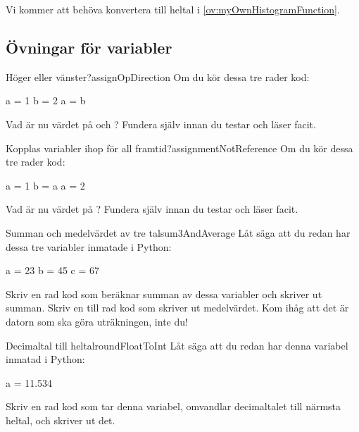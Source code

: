 Vi kommer att behöva konvertera till heltal i \autoref{ov:myOwnHistogramFunction}.

\subsection{Övningar för variabler}

\begin{matteovning}{Höger eller vänster?}{assignOpDirection}
Om du kör dessa tre rader kod:
\vspace{10pt}
\begin{python}
a = 1
b = 2
a = b
\end{python}

Vad är nu värdet på  och ? Fundera själv innan du testar och läser facit.
\end{matteovning}

\begin{matteovning}{Kopplas variabler ihop för all framtid?}{assignmentNotReference}
Om du kör dessa tre rader kod:
\vspace{10pt}
\begin{python}
a = 1
b = a
a = 2
\end{python}

Vad är nu värdet på ? Fundera själv innan du testar och läser facit.
\end{matteovning}

\begin{matteovning}{Summan och medelvärdet av tre tal}{sum3AndAverage}
Låt säga att du redan har dessa tre variabler inmatade i Python:
\vspace{10pt}
\begin{python}
a = 23
b = 45
c = 67
\end{python}

Skriv en rad kod som beräknar summan av dessa variabler och skriver ut summan.
\newline
\newline
Skriv en till rad kod som skriver ut medelvärdet. Kom ihåg att det är datorn som ska göra uträkningen, inte du!
\end{matteovning}
\begin{matteovning}{Decimaltal till heltal}{roundFloatToInt}
Låt säga att du redan har denna variabel inmatad i Python:
\vspace{10pt}
\begin{python}
a = 11.534
\end{python}

Skriv en rad kod som tar denna variabel, omvandlar decimaltalet till närmsta heltal, och skriver ut det.
\end{matteovning}


